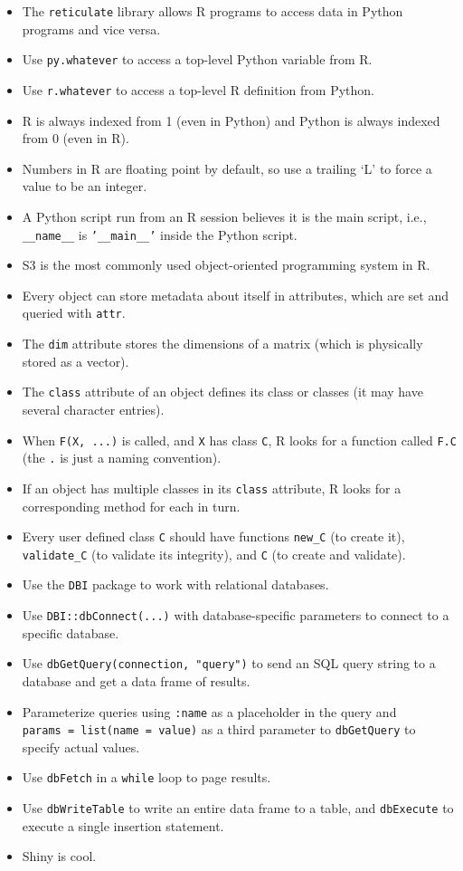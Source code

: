\begin{itemize}
\item
  The \texttt{reticulate} library allows R programs to access data in Python programs and vice versa.
\item
  Use \texttt{py.whatever} to access a top-level Python variable from R.
\item
  Use \texttt{r.whatever} to access a top-level R definition from Python.
\item
  R is always indexed from 1 (even in Python) and Python is always indexed from 0 (even in R).
\item
  Numbers in R are floating point by default, so use a trailing `L' to force a value to be an integer.
\item
  A Python script run from an R session believes it is the main script, i.e., \texttt{\_\_name\_\_} is \texttt{'\_\_main\_\_'} inside the Python script.
\item
  S3 is the most commonly used object-oriented programming system in R.
\item
  Every object can store metadata about itself in attributes, which are set and queried with \texttt{attr}.
\item
  The \texttt{dim} attribute stores the dimensions of a matrix (which is physically stored as a vector).
\item
  The \texttt{class} attribute of an object defines its class or classes (it may have several character entries).
\item
  When \texttt{F(X,\ ...)} is called, and \texttt{X} has class \texttt{C}, R looks for a function called \texttt{F.C} (the \texttt{.} is just a naming convention).
\item
  If an object has multiple classes in its \texttt{class} attribute, R looks for a corresponding method for each in turn.
\item
  Every user defined class \texttt{C} should have functions \texttt{new\_C} (to create it), \texttt{validate\_C} (to validate its integrity), and \texttt{C} (to create and validate).
\item
  Use the \texttt{DBI} package to work with relational databases.
\item
  Use \texttt{DBI::dbConnect(...)} with database-specific parameters to connect to a specific database.
\item
  Use \texttt{dbGetQuery(connection,\ "query")} to send an SQL query string to a database and get a data frame of results.
\item
  Parameterize queries using \texttt{:name} as a placeholder in the query and \texttt{params~=~list(name~=~value)} as a third parameter to \texttt{dbGetQuery} to specify actual values.
\item
  Use \texttt{dbFetch} in a \texttt{while} loop to page results.
\item
  Use \texttt{dbWriteTable} to write an entire data frame to a table, and \texttt{dbExecute} to execute a single insertion statement.
\item
  Shiny is cool.
\end{itemize}

